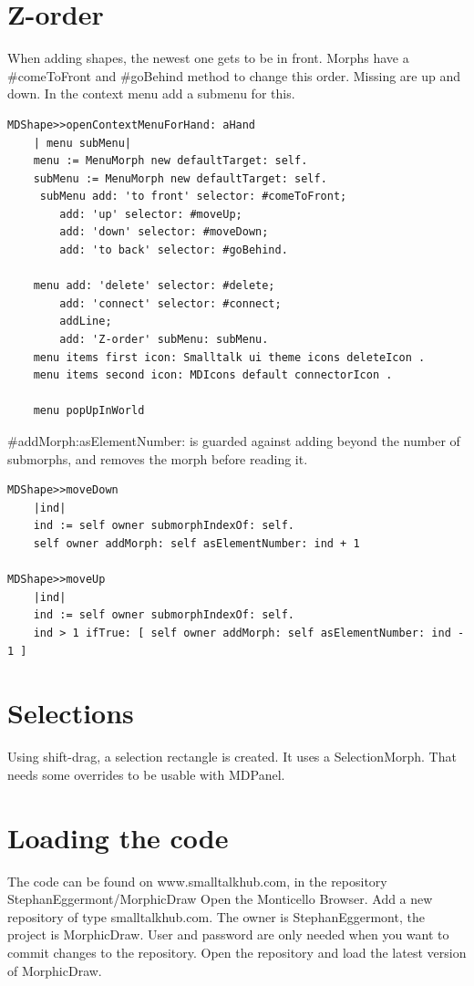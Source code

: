 \documentclass[10pt]{article}   	%
\begin{document}
\section{Z-order}
When adding shapes, the newest one gets to be in front. Morphs have a \#comeToFront
and \#goBehind method to change this order. Missing are up and down.
In the context menu add a submenu for this.
\begin{verbatim}
MDShape>>openContextMenuForHand: aHand
    | menu subMenu|
    menu := MenuMorph new defaultTarget: self.
    subMenu := MenuMorph new defaultTarget: self.
     subMenu add: 'to front' selector: #comeToFront;
        add: 'up' selector: #moveUp;
        add: 'down' selector: #moveDown;
        add: 'to back' selector: #goBehind.
	
    menu add: 'delete' selector: #delete;
        add: 'connect' selector: #connect;
        addLine;
        add: 'Z-order' subMenu: subMenu.
    menu items first icon: Smalltalk ui theme icons deleteIcon .
    menu items second icon: MDIcons default connectorIcon .

    menu popUpInWorld
\end{verbatim}

\#addMorph:asElementNumber: is guarded against adding beyond the number of 
submorphs, and removes the morph before reading it.
\begin{verbatim}
MDShape>>moveDown
    |ind|
    ind := self owner submorphIndexOf: self.
    self owner addMorph: self asElementNumber: ind + 1 

MDShape>>moveUp
    |ind|
    ind := self owner submorphIndexOf: self.
    ind > 1 ifTrue: [ self owner addMorph: self asElementNumber: ind - 1 ]
\end{verbatim}
\section{Selections}
Using shift-drag, a selection rectangle is created. It uses a SelectionMorph.
That needs some overrides to be usable with MDPanel. 

\section{Loading the code}
The code can be found on www.smalltalkhub.com, in the repository StephanEggermont/MorphicDraw
Open the Monticello Browser. Add a new repository of type smalltalkhub.com. 
The owner is StephanEggermont, the project is MorphicDraw. User and password are only needed
when you want to commit changes to the repository. Open the repository and load the latest version of
MorphicDraw.
\end{document}
